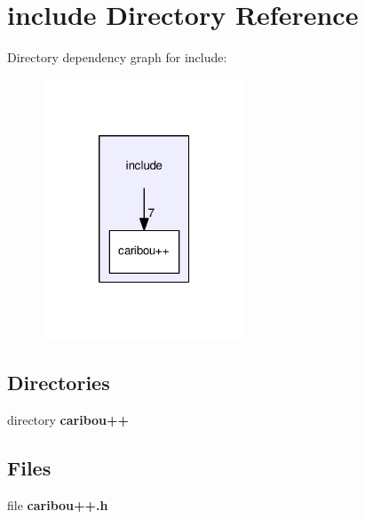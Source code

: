 \section{include Directory Reference}
\label{dir_5c16880a7ad11d8ee1ced83eeec1dd95}
Directory dependency graph for include\-:\nopagebreak
\begin{figure}[H]
\begin{center}
\leavevmode
\includegraphics[width=172pt]{dir_5c16880a7ad11d8ee1ced83eeec1dd95_dep}
\end{center}
\end{figure}
\subsection*{Directories}
\begin{DoxyCompactItemize}
\item 
directory {\bf caribou++}
\end{DoxyCompactItemize}
\subsection*{Files}
\begin{DoxyCompactItemize}
\item 
file {\bf caribou++.\-h}
\end{DoxyCompactItemize}
